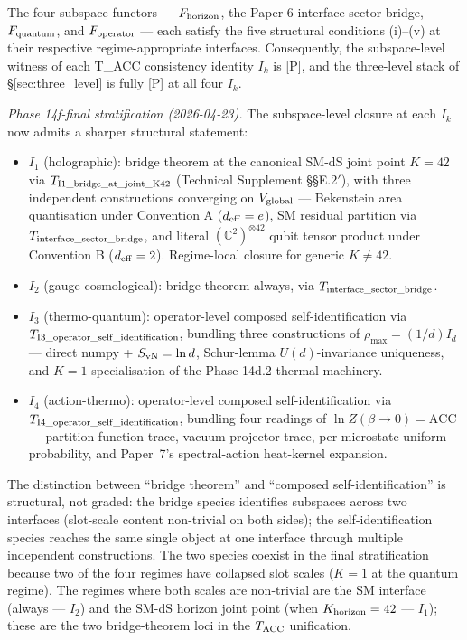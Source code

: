 \documentclass[11pt]{article}
\begin{document}
\begin{tcolorbox}[apfbox, title={Theorem T\_subspace\_functors\_unified}]
The four subspace functors --- $F_{\rm horizon}$, the Paper-6 interface-sector bridge, $F_{\rm quantum}$, and $F_{\rm operator}$ --- each satisfy the five structural conditions (i)--(v) at their respective regime-appropriate interfaces. Consequently, the subspace-level witness of each T\_ACC consistency identity $I_k$ is [P], and the three-level stack of \S\ref{sec:three_level} is fully [P] at all four $I_k$.

\smallskip

\noindent\textit{Phase 14f-final stratification (2026-04-23).} The subspace-level closure at each $I_k$ now admits a sharper structural statement:
\begin{itemize}[leftmargin=2em,itemsep=3pt]
  \item $I_1$ (holographic): bridge theorem at the canonical SM-dS joint point $K = 42$ via $T_{\rm I1\_bridge\_at\_joint\_K42}$ (Technical Supplement \S\S E.2$'$), with three independent constructions converging on $V_{\rm global}$ --- Bekenstein area quantisation under Convention A ($d_{\rm eff} = e$), SM residual partition via $T_{\rm interface\_sector\_bridge}$, and literal $(\mathbb{C}^2)^{\otimes 42}$ qubit tensor product under Convention B ($d_{\rm eff} = 2$).  Regime-local closure for generic $K \neq 42$.
  \item $I_2$ (gauge-cosmological): bridge theorem always, via $T_{\rm interface\_sector\_bridge}$.
  \item $I_3$ (thermo-quantum): operator-level composed self-identification via $T_{\rm I3\_operator\_self\_identification}$, bundling three constructions of $\rho_{\max} = (1/d) I_d$ --- direct numpy + $S_{\rm vN} = \ln d$, Schur-lemma $U(d)$-invariance uniqueness, and $K{=}1$ specialisation of the Phase 14d.2 thermal machinery.
  \item $I_4$ (action-thermo): operator-level composed self-identification via $T_{\rm I4\_operator\_self\_identification}$, bundling four readings of $\ln Z(\beta \to 0) = \mathrm{ACC}$ --- partition-function trace, vacuum-projector trace, per-microstate uniform probability, and Paper~7's spectral-action heat-kernel expansion.
\end{itemize}
The distinction between ``bridge theorem'' and ``composed self-identification'' is structural, not graded: the bridge species identifies subspaces across two interfaces (slot-scale content non-trivial on both sides); the self-identification species reaches the same single object at one interface through multiple independent constructions.  The two species coexist in the final stratification because two of the four regimes have collapsed slot scales ($K = 1$ at the quantum regime).  The regimes where both scales are non-trivial are the SM interface (always --- $I_2$) and the SM-dS horizon joint point (when $K_{\rm horizon} = 42$ --- $I_1$); these are the two bridge-theorem loci in the $T_{\rm ACC}$ unification.
\end{tcolorbox}
\end{document}

